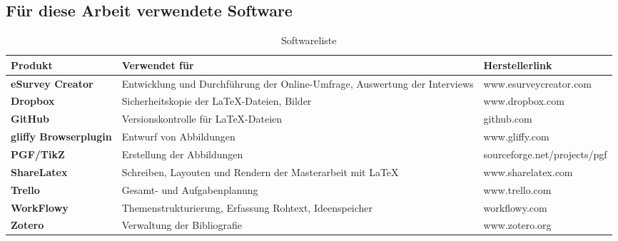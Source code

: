 \documentclass[main.tex]{subfiles}
\begin{document}
\subsection*{Für diese Arbeit verwendete Software}


\begin{table}[H]
\caption{Softwareliste}
\label{used-sw}


\begin{tabular}{ |p{3cm}|p{8cm}|l| }


\hline
\rowcolor[HTML]{C0C0C0} 
\textbf{Produkt} & \textbf{Verwendet für} & \textbf{Herstellerlink}\\ 
\hline


\textbf{eSurvey Creator} & Entwicklung und Durchführung der Online-Umfrage, \newline Auswertung der Interviews & www.esurveycreator.com \\ \hline
\textbf{Dropbox} & Sicherheitskopie der \LaTeX  -Dateien, Bilder & www.dropbox.com \\ \hline
\textbf{GitHub} & Versionskontrolle für \LaTeX  -Dateien & github.com \\ \hline
\textbf{gliffy Browserplugin} & Entwurf von Abbildungen & www.gliffy.com \\ \hline
\textbf{PGF/TikZ} & Erstellung der Abbildungen & sourceforge.net/projects/pgf \\ \hline
\textbf{ShareLatex} & Schreiben, Layouten und Rendern der Masterarbeit mit \LaTeX & www.sharelatex.com \\ \hline
\textbf{Trello} & Gesamt- und Aufgabenplanung  & www.trello.com \\ \hline
\textbf{WorkFlowy} & Themenstrukturierung, Erfassung Rohtext, Ideenspeicher & workflowy.com \\ \hline
\textbf{Zotero} & Verwaltung der Bibliografie & www.zotero.org \\ \hline

\end{tabular}
\end{table}
\end{document}

